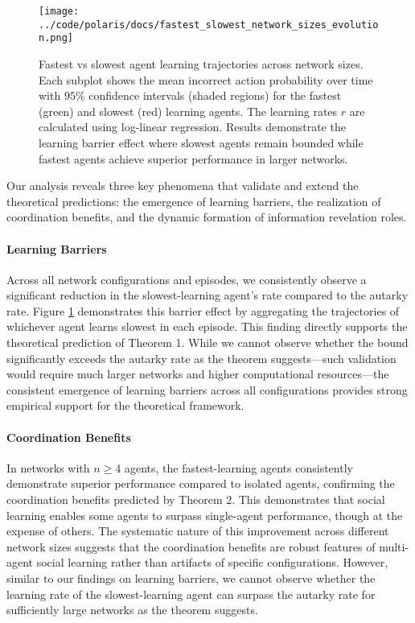 \begin{figure}[!htbp]
    \centering
    \texttt{[image: ../code/polaris/docs/fastest\_slowest\_network\_sizes\_evolution.png]}
    \caption{Fastest vs slowest agent learning trajectories across network sizes. Each subplot shows the mean incorrect action probability over time with $95\%$ confidence intervals (shaded regions) for the fastest (green) and slowest (red) learning agents. The learning rates $r$ are calculated using log-linear regression. Results demonstrate the learning barrier effect where slowest agents remain bounded while fastest agents achieve superior performance in larger networks.}
    \label{fig:size_comparison}
\end{figure}

Our analysis reveals three key phenomena that validate and extend the theoretical predictions: the emergence of learning barriers, the realization of coordination benefits, and the dynamic formation of information revelation roles.

\paragraph{Learning Barriers} Across all network configurations and episodes, we consistently observe a significant reduction in the slowest-learning agent's rate compared to the autarky rate. Figure \ref{fig:size_comparison} demonstrates this barrier effect by aggregating the trajectories of whichever agent learns slowest in each episode. This finding directly supports the theoretical prediction of Theorem 1. While we cannot observe whether the bound significantly exceeds the autarky rate as the theorem suggests—such validation would require much larger networks and higher computational resources—the consistent emergence of learning barriers across all configurations provides strong empirical support for the theoretical framework.

\paragraph{Coordination Benefits} In networks with $n \geq 4$ agents, the fastest-learning agents consistently demonstrate superior performance compared to isolated agents, confirming the coordination benefits predicted by Theorem 2. This demonstrates that social learning enables some agents to surpass single-agent performance, though at the expense of others. The systematic nature of this improvement across different network sizes suggests that the coordination benefits are robust features of multi-agent social learning rather than artifacts of specific configurations. However, similar to our findings on learning barriers, we cannot observe whether the learning rate of the slowest-learning agent can surpass the autarky rate for sufficiently large networks as the theorem suggests.

